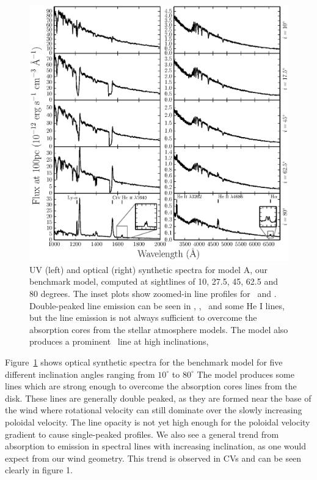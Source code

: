 \documentclass[preprint, a4paper, 11pt]{aastex}
\begin{document}
\begin{figure} %
\includegraphics[width=\textwidth]{figures/fig5_uv_opt.eps}
\caption{
UV (left) and optical (right) synthetic spectra for model A, our benchmark model,
computed at sightlines of 10, 27.5, 45, 62.5 and 80 degrees.	
The inset plots show zoomed-in line profiles for 
\heiiuv\ and \ha. Double-peaked line emission can be seen in 
\heiiuv, \heiiopt, \ha\ and some He I lines, but the 
line emission is not always sufficient to overcome the absorption
cores from the stellar atmosphere models. The model
also produces a prominent \heiioptnew\ line at high inclinations,
}
\label{spec}
\end{figure} %

Figure~\ref{spec} shows optical synthetic spectra for the benchmark 
model for five different inclination angles ranging from $10^\circ$ to $80^\circ$ 
The model produces some lines which are strong enough to overcome
the absorption cores lines from the disk. These lines are generally double peaked, 
as they are formed near the base of the wind where rotational velocity
can still dominate over the slowly increasing poloidal velocity. The line 
opacity is not yet high enough for the poloidal velocity gradient to 
cause single-peaked profiles. 
We also see a general trend from absorption to emission in spectral lines
with increasing inclination, as one would expect from our wind geometry.
This trend is observed in CVs and can be seen clearly in figure 1. 
\end{document}
